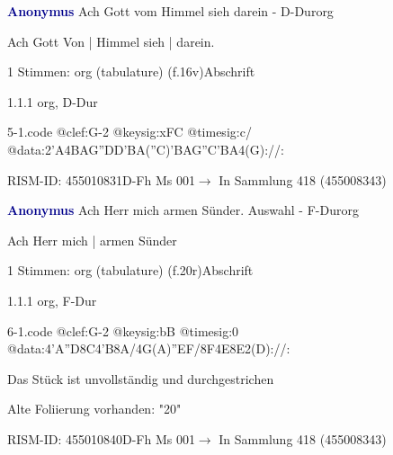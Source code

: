 \documentclass[twocolumn]{book}
\begin{document}
\par \vspace{7pt} \textcolor{darkblue}{\textbf{Anonymus  }}\hfillplus{\textbf{[5]}}\newline Ach Gott vom Himmel sieh darein - D-Dur\newline org
\par \begin{itshape}[f.16v, at left:] Ach Gott Von | Himmel sieh | darein.\end{itshape} 
\par \textcolor{darkblue}{}  1 Stimmen: org (tabulature)  (f.16v)\newline Abschrift
\par 1.1.1  org, D-Dur  
\begin{filecontents*}{5-1.code}
@clef:G-2
@keysig:xFC
@timesig:c/
@data:2'A4BAG''DD'BA(''C)'BAG''C'BA4(G)://:
\end{filecontents*}
\newline
%
\par RISM-ID: 455010831\newline D-Fh  Ms 001\newline $\rightarrow$ In Sammlung 418 (455008343)
      
\par \vspace{7pt} \textcolor{darkblue}{\textbf{Anonymus  }}\hfillplus{\textbf{[6]}}\newline Ach Herr mich armen Sünder. Auswahl - F-Dur\newline org
\par \begin{itshape}[f.20r, at left:] Ach Herr mich | armen Sünder\end{itshape} 
\par \textcolor{darkblue}{}  1 Stimmen: org (tabulature)  (f.20r)\newline Abschrift
\par 1.1.1  org, F-Dur  
\begin{filecontents*}{6-1.code}
@clef:G-2
@keysig:bB
@timesig:0
@data:4'A''D8C4'B8A/4G(A)''EF/8F4E8E2(D)://:
\end{filecontents*}
\newline
%
\par Das Stück ist unvollständig und durchgestrichen
\par Alte Foliierung vorhanden: "20"
\par RISM-ID: 455010840\newline D-Fh  Ms 001\newline $\rightarrow$ In Sammlung 418 (455008343)
      
\end{document}
